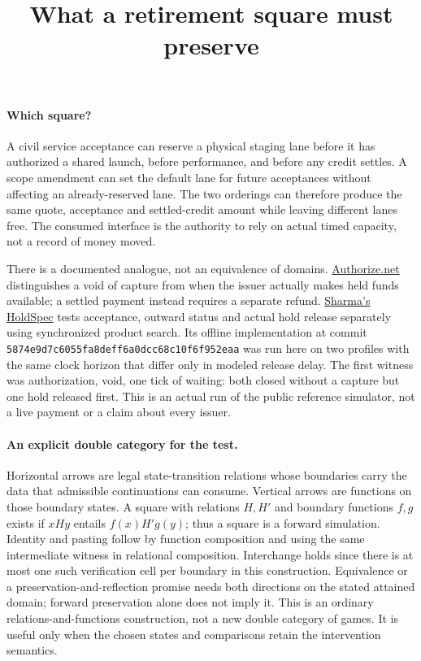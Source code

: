 \documentclass{article}
\title{What a retirement square must preserve}
\date{}
\begin{document}
\maketitle

\paragraph{Which square?}
A civil service acceptance can reserve a physical staging lane before it has authorized a shared launch, before performance, and before any credit settles. A scope amendment can set the default lane for future acceptances without affecting an already-reserved lane. The two orderings can therefore produce the same quote, acceptance and settled-credit amount while leaving different lanes free. The consumed interface is the authority to rely on actual timed capacity, not a record of money moved.

There is a documented analogue, not an equivalence of domains. \href{https://support.authorize.net/knowledgebase/article/000001346/}{Authorize.net} distinguishes a void of capture from when the issuer actually makes held funds available; a settled payment instead requires a separate refund. \href{https://arxiv.org/abs/2610.14419}{Sharma's HoldSpec} tests acceptance, outward status and actual hold release separately using synchronized product search. Its offline implementation at commit \texttt{5874e9d7c6055fa8deff6a0dcc68c10f6f952eaa} was run here on two profiles with the same clock horizon that differ only in modeled release delay. The first witness was authorization, void, one tick of waiting: both closed without a capture but one hold released first. This is an actual run of the public reference simulator, not a live payment or a claim about every issuer.

\paragraph{An explicit double category for the test.}
Horizontal arrows are legal state-transition relations whose boundaries carry the data that admissible continuations can consume. Vertical arrows are functions on those boundary states. A square with relations $H,H'$ and boundary functions $f,g$ exists if $xHy$ entails $f(x)H'g(y)$; thus a square is a forward simulation. Identity and pasting follow by function composition and using the same intermediate witness in relational composition. Interchange holds since there is at most one such verification cell per boundary in this construction. Equivalence or a preservation-and-reflection promise needs both directions on the stated attained domain; forward preservation alone does not imply it. This is an ordinary relations-and-functions construction, not a new double category of games. It is useful only when the chosen states and comparisons retain the intervention semantics.
\end{document}

